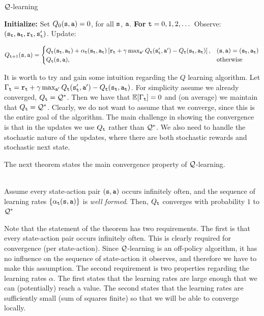 \begin{algorithm}[H]
\caption{$\mathcal{Q}$-learning}
\begin{algorithmic}[1]
\State \textbf{Initialize:} Set $Q_0({\tt s},{\tt a}) = 0$, for all ${\tt s}$, ${\tt a}$.
\State \textbf{For} {${\tt t} = 0, 1, 2, \dots$}
    \State \quad Observe: $({\tt s}_{\tt t}, {\tt a}_{\tt t}, {\tt r}_{\tt t}, {\tt s}_{{\tt t}}')$.
    \State \quad Update:
    \begin{small}
    \[
    Q_{{\tt t}+1}({\tt s}, {\tt a}) = \begin{cases}
        Q_{\tt t}({\tt s}_{\tt t}, {\tt a}_{\tt t}) + \alpha_{\tt t}({\tt s}_{\tt t}, {\tt a}_{\tt t}) \left[{\tt r}_{\tt t} + \gamma \max_{{\tt a}'} Q_{\tt t}({\tt s}_{{\tt t}}', {\tt a}') - Q_{\tt t}({\tt s}_{\tt t}, {\tt a}_{\tt t})\right], &  ({\tt s},{\tt a})=({\tt s}_{\tt t}, {\tt a}_{\tt t}) \\
        Q_{\tt t}({\tt s}, {\tt a}), & \textrm{otherwise}
    \end{cases}
    \]    
    \end{small}
\end{algorithmic}
\end{algorithm}


It is worth to try and gain some intuition regarding the $Q$
learning algorithm. Let $\Gamma_{\tt t}= {\tt r}_{\tt t} + \gamma
\max_{{\tt a}'} Q_{\tt t} ({\tt s}_{{\tt t}}', {\tt a}')-Q_{\tt t}
({\tt s}_{\tt t},{\tt a}_{\tt t})$.
%
For simplicity assume we already converged,
%
$Q_{\tt t}=\mathcal{Q}^*$. Then we have that $\mathbb{E}[\Gamma_{\tt t}]=0$ and (on
average) we maintain that $Q_{\tt t}=\mathcal{Q}^*$.
%
Clearly, we do not want to assume that we converge, since this is the
entire goal of the algorithm.
%
The main challenge in showing the convergence is that in the updates
we use $Q_{\tt t}$ rather than $\mathcal{Q}^*$. We also need to handle the
stochastic nature of the updates, where there are both stochastic
rewards and stochastic next state.

The next theorem states the main convergence property of
$\mathcal{Q}$-learning.
\begin{theorem}\ \\
\label{thm:Q-learning} Assume every state-action pair
$({\tt s},{\tt a})$ occurs infinitely often, and the sequence of learning rates $\{\alpha_{\tt t}({\tt s},{\tt a})\}$ is \emph{well formed}.
Then, $Q_{\tt t}$ converges with probability $1$ to $\mathcal{Q}^*$
\end{theorem}

Note that the statement of the theorem has two requirements. The
first is that every state-action pair occurs infinitely often.
This is clearly required for convergence (per state-action). Since
$\mathcal{Q}$-learning is an off-policy algorithm, it has no influence on the sequence
of state-action it observes, and therefore we have to make this
assumption. The second requirement is two properties regarding the
learning rates $\alpha$. The first states that the learning rates
are large enough that we can (potentially) reach a value. The
second states that the learning rates are sufficiently small (sum of
squares finite) so that we will be able to converge locally.

